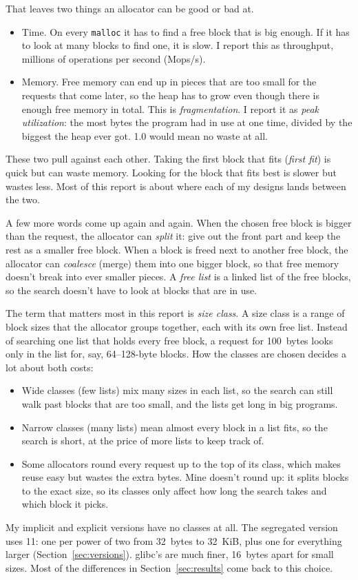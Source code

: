 \documentclass[11pt,letterpaper]{article}
\begin{document}
That leaves two things an allocator can be good or bad at.

\begin{itemize}
  \item Time. On every \texttt{malloc} it has to find a free block that is big enough. If it has to look at many blocks to find one, it is slow. I report this as throughput, millions of operations per second (Mops/s).
  \item Memory. Free memory can end up in pieces that are too small for the requests that come later, so the heap has to grow even though there is enough free memory in total. This is \emph{fragmentation}. I report it as \emph{peak utilization}: the most bytes the program had in use at one time, divided by the biggest the heap ever got. 1.0 would mean no waste at all.
\end{itemize}

These two pull against each other. Taking the first block that fits (\emph{first fit}) is quick but can waste memory. Looking for the block that fits best is slower but wastes less. Most of this report is about where each of my designs lands between the two.

A few more words come up again and again. When the chosen free block is bigger than the request, the allocator can \emph{split} it: give out the front part and keep the rest as a smaller free block. When a block is freed next to another free block, the allocator can \emph{coalesce} (merge) them into one bigger block, so that free memory doesn't break into ever smaller pieces. A \emph{free list} is a linked list of the free blocks, so the search doesn't have to look at blocks that are in use.

The term that matters most in this report is \emph{size class}. A size class is a range of block sizes that the allocator groups together, each with its own free list. Instead of searching one list that holds every free block, a request for 100~bytes looks only in the list for, say, 64--128-byte blocks. How the classes are chosen decides a lot about both costs:
\begin{itemize}
  \item Wide classes (few lists) mix many sizes in each list, so the search can still walk past blocks that are too small, and the lists get long in big programs.
  \item Narrow classes (many lists) mean almost every block in a list fits, so the search is short, at the price of more lists to keep track of.
  \item Some allocators round every request up to the top of its class, which makes reuse easy but wastes the extra bytes. Mine doesn't round up: it splits blocks to the exact size, so its classes only affect how long the search takes and which block it picks.
\end{itemize}
My implicit and explicit versions have no classes at all. The segregated version uses 11: one per power of two from 32~bytes to 32~KiB, plus one for everything larger (Section~\ref{sec:versions}). glibc's are much finer, 16~bytes apart for small sizes. Most of the differences in Section~\ref{sec:results} come back to this choice.
\end{document}
